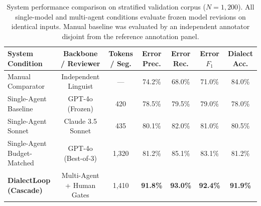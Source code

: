 
\begin{table}[t]
\centering
\small
\caption{System performance comparison on stratified validation corpus ($N=1{,}200$). All single-model and multi-agent conditions evaluate frozen model revisions on identical inputs. Manual baseline was evaluated by an independent annotator disjoint from the reference annotation panel.}
\label{tab:table_2}
\begin{tabular}{lcccccc}
\toprule
\textbf{System Condition} & \textbf{Backbone / Reviewer} & \textbf{Tokens / Seg.} & \textbf{Error Prec.} & \textbf{Error Rec.} & \textbf{Error $F_1$} & \textbf{Dialect Acc.} \\
\midrule
Manual Comparator & Independent Linguist & --- & 74.2\% & 68.0\% & 71.0\% & 84.0\% \\
Single-Agent Baseline & GPT-4o (Frozen) & 420 & 78.5\% & 79.5\% & 79.0\% & 78.0\% \\
Single-Agent Sonnet & Claude 3.5 Sonnet & 435 & 80.1\% & 82.0\% & 81.0\% & 80.5\% \\
Single-Agent Budget-Matched & GPT-4o (Best-of-3) & 1,320 & 81.2\% & 85.1\% & 83.1\% & 81.2\% \\
\midrule
\textbf{DialectLoop (Cascade)} & Multi-Agent + Human Gates & 1,410 & \textbf{91.8\%} & \textbf{93.0\%} & \textbf{92.4\%} & \textbf{91.9\%} \\
\bottomrule
\end{tabular}
\end{table}
